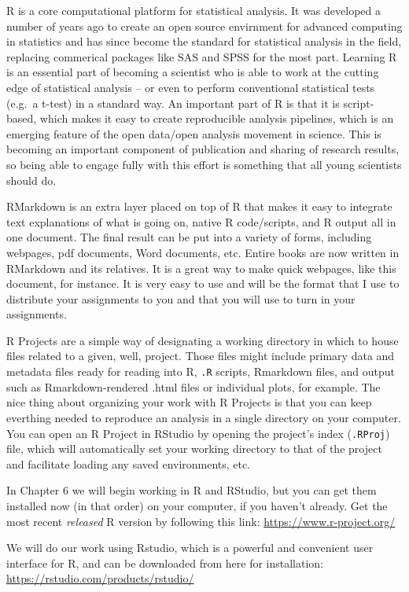 \documentclass[]{book}
\begin{document}
R is a core computational platform for statistical analysis. It was developed a number of years ago to create an open source envirnment for advanced computing in statistics and has since become the standard for statistical analysis in the field, replacing commerical packages like SAS and SPSS for the most part. Learning R is an essential part of becoming a scientist who is able to work at the cutting edge of statistical analysis -- or even to perform conventional statistical tests (e.g.~a t-test) in a standard way. An important part of R is that it is script-based, which makes it easy to create reproducible analysis pipelines, which is an emerging feature of the open data/open analysis movement in science. This is becoming an important component of publication and sharing of research results, so being able to engage fully with this effort is something that all young scientists should do.

RMarkdown is an extra layer placed on top of R that makes it easy to integrate text explanations of what is going on, native R code/scripts, and R output all in one document. The final result can be put into a variety of forms, including webpages, pdf documents, Word documents, etc. Entire books are now written in RMarkdown and its relatives. It is a great way to make quick webpages, like this document, for instance. It is very easy to use and will be the format that I use to distribute your assignments to you and that you will use to turn in your assignments.

R Projects are a simple way of designating a working directory in which to house files related to a given, well, project. Those files might include primary data and metadata files ready for reading into R, \texttt{.R} scripts, Rmarkdown files, and output such as Rmarkdown-rendered .html files or individual plots, for example. The nice thing about organizing your work with R Projects is that you can keep everthing needed to reproduce an analysis in a single directory on your computer. You can open an R Project in RStudio by opening the project's index (\texttt{.RProj}) file, which will automatically set your working directory to that of the project and facilitate loading any saved environments, etc.

In Chapter 6 we will begin working in R and RStudio, but you can get them installed now (in that order) on your computer, if you haven't already. Get the most recent \emph{released} R version by following this link:
\url{https://www.r-project.org/}

We will do our work using Rstudio, which is a powerful and convenient user interface for R, and can be downloaded from here for installation:
\url{https://rstudio.com/products/rstudio/}
\end{document}
